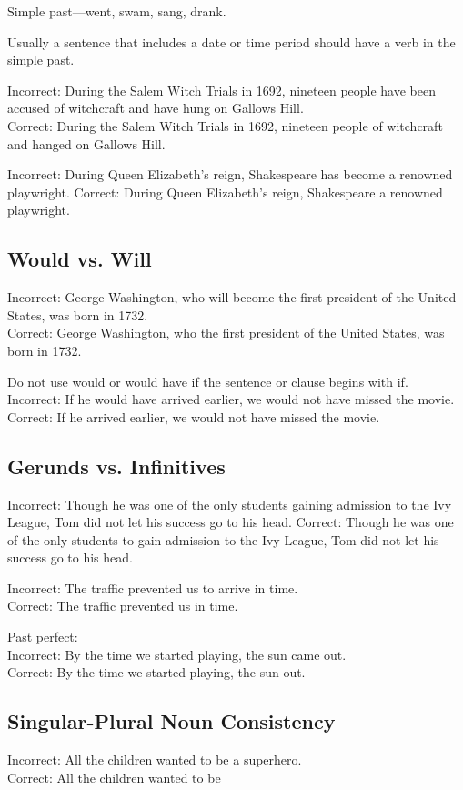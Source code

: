 \documentclass[12pt]{book}
\newcommand{\longline}{\underline{\hspace{2in}} }
\begin{document}
\bigskip
Simple past—went, swam, sang, drank.

\bigskip
Usually a sentence that includes a date or time period should have a verb in the simple past.  

\bigskip
Incorrect:  During the Salem Witch Trials in 1692, nineteen people have been accused of witchcraft and have hung on Gallows Hill.\\
Correct:  During the Salem Witch Trials in 1692, nineteen people \longline of witchcraft and hanged on Gallows Hill.

\bigskip
Incorrect:  During Queen Elizabeth's reign, Shakespeare has become a renowned playwright.
Correct:  During Queen Elizabeth's reign, Shakespeare \longline a renowned playwright.

\subsection{Would vs. Will}
Incorrect:  George Washington, who will become the first president of the United States, was born in 1732.\\
Correct:  George Washington, who \longline the first president of the United States, was born in 1732.

\bigskip
Do not use would or would have if the sentence or clause begins with if.
Incorrect:  If he would have arrived earlier, we would not have missed the movie. \\
Correct:  If he \longline arrived earlier, we would not have missed the movie.

\subsection{Gerunds vs. Infinitives}
Incorrect: Though he was one of the only students gaining admission to the Ivy League, Tom did not let his success go to his head.
Correct:  Though he was one of the only students to gain admission to the Ivy League, Tom did not let his success go to his head.

\bigskip
Incorrect:  The traffic prevented us to arrive in time.\\
Correct:  The traffic prevented us \longline in time.

\bigskip
Past perfect: \\
Incorrect:  By the time we started playing, the sun came out.\\
Correct:  By the time we started playing, the sun \longline out.

\subsection{Singular-Plural Noun Consistency}
Incorrect:  All the children wanted to be a superhero. \\
Correct:  All the children wanted to be \hrulefill 
\end{document}
